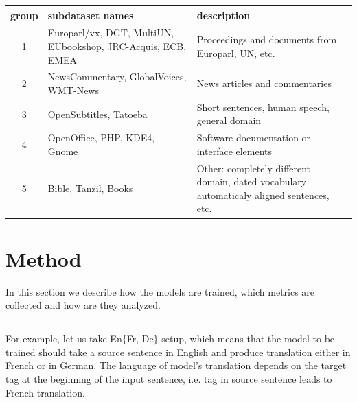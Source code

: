 \begin{table}[h!]
	\centering
	\begin{tabular}{c|p{}|p{}}
	\toprule
	     group & subdataset names  & description \\
	\midrule
	 1 &  Europarl/vx, DGT, MultiUN, EUbookshop, JRC-Acquis,
	      ECB, EMEA
	   &  Proceedings and documents from Europarl, UN, etc. \\
	 2 &  NewsCommentary, GlobalVoices, WMT-News 
	   &  News articles and commentaries \\
	 3 &  OpenSubtitles, Tatoeba
	   &  Short sentences, human speech, general domain \\
	 4 &  OpenOffice, PHP, KDE4, Gnome
	   &  Software documentation or interface elements \\
	 5 &  Bible, Tanzil, Books 
	   &  Other: completely different domain, dated vocabulary
	      automaticaly aligned sentences, etc. \\
	\bottomrule
	\end{tabular}

	\label{tab:subdatasets_groups}
\end{table}


\subsection{}
\label{subsection:en-to-5}

\cite{eisele-chen-2010-multiun}


\section{Method}
\label{section:method}

In this section we describe how the models are trained, which metrics
are collected and how are they analyzed.

\subsection{}

For example, let us take En\to{}$\{$Fr, De$\}$ setup, which means that
the model to be trained should take a source sentence in English and
produce translation either in French or in German.
The language of model's translation depends on the target tag at the beginning
of the input sentence, i.e.  tag in source sentence leads to French
translation.

